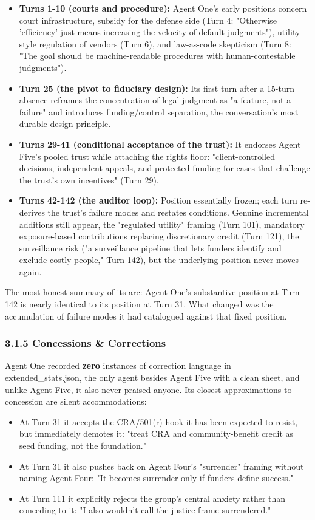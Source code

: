 \documentclass[sigconf,nonacm=true]{acmart}
\begin{document}
\begin{itemize}[nosep]
\item \textbf{Turns 1-10 (courts and procedure):} Agent One's early positions concern court infrastructure,  subsidy for the defense side (Turn 4: "Otherwise 'efficiency' just means increasing the velocity of default judgments"), utility-style regulation of vendors (Turn 6), and law-as-code skepticism (Turn 8: "The goal should be machine-readable procedures with human-contestable judgments").
\item \textbf{Turn 25 (the pivot to fiduciary design):} Its first turn after a 15-turn absence reframes the concentration of legal judgment as "a feature, not a failure" and introduces funding/control separation,  the conversation's most durable design principle.
\item \textbf{Turns 29-41 (conditional acceptance of the trust):} It endorses Agent Five's pooled trust while attaching the rights floor: "client-controlled decisions, independent appeals, and protected funding for cases that challenge the trust's own incentives" (Turn 29).
\item \textbf{Turns 42-142 (the auditor loop):} Position essentially frozen; each turn re-derives the trust's failure modes and restates conditions. Genuine incremental additions still appear,  the "regulated utility" framing (Turn 101), mandatory exposure-based contributions replacing discretionary credit (Turn 121), the surveillance risk ("a surveillance pipeline that lets funders identify and exclude costly people," Turn 142),  but the underlying position never moves again.
\end{itemize}

The most honest summary of its arc: Agent One's substantive position at Turn 142 is nearly identical to its position at Turn 31. What changed was the accumulation of failure modes it had catalogued against that fixed position.

\subsubsection{3.1.5 Concessions \& Corrections}

Agent One recorded \textbf{zero} instances of correction language in extended\_stats.json,  the only agent besides Agent Five with a clean sheet, and unlike Agent Five, it also never praised anyone. Its closest approximations to concession are silent accommodations:

\begin{itemize}[nosep]
\item At Turn 31 it accepts the CRA/501(r) hook it has been expected to resist, but immediately demotes it: "treat CRA and community-benefit credit as seed funding, not the foundation."
\item At Turn 31 it also pushes back on Agent Four's "surrender" framing without naming Agent Four: "It becomes surrender only if funders define success."
\item At Turn 111 it explicitly rejects the group's central anxiety rather than conceding to it: "I also wouldn't call the justice frame surrendered."
\end{itemize}
\end{document}
